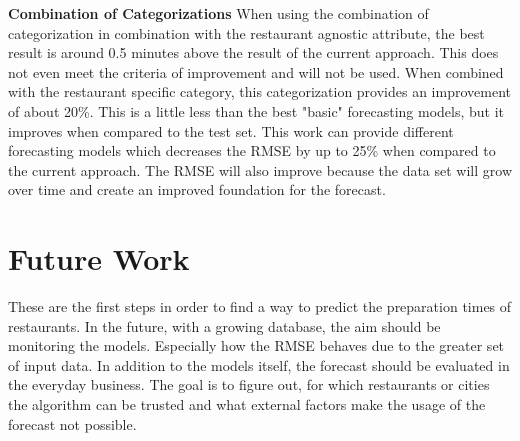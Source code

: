 \newline\textbf{Combination of Categorizations}\newline
When using the combination of categorization in combination with the restaurant agnostic attribute, the best result is around 0.5 minutes above the result of the current approach. This does not even meet the criteria of improvement and will not be used.\newline
When combined with the restaurant specific category, this categorization provides an improvement of about 20\%. This is a little less than the best "basic" forecasting models, but it improves when compared to the test set.
\newline\newline
This work can provide different forecasting models which decreases the RMSE by up to 25\% when compared to the current approach. The RMSE will also improve because the data set will grow over time and create an improved foundation for the forecast.
\section{Future Work}
These are the first steps in order to find a way to predict the preparation times of restaurants. In the future, with a growing database, the aim should be monitoring the models. Especially how the RMSE behaves due to the greater set of input data.\newline
In addition to the models itself, the forecast should be evaluated in the everyday business. The goal is to figure out, for which restaurants or cities the algorithm can be trusted and what external factors make the usage of the forecast not possible.
